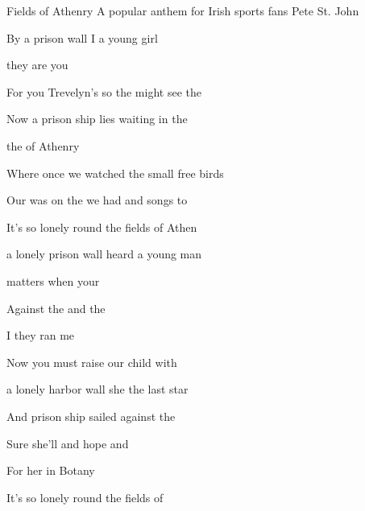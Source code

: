 \begin{SBSong}{Fields of Athenry}
  {A popular anthem for Irish sports fans}
  {Pete St. John}
  \begin{SBVerse}
    By a  prison wall I  a young girl  
    
     they are  you 

    For you  Trevelyn's  so the  might see the 

    Now a prison ship lies waiting in the 
  \end{SBVerse}
  \begin{SBChorus}
      the  of Athenry

    Where once we watched the small free birds 

    Our  was on the  we had  and songs to 

    It's so lonely round the fields of Athen
  \end{SBChorus}
  \begin{SBVerse}
     a lonely prison wall  heard a young man 

     matters  when your 

    Against the  and the 

    I  they ran me 

    Now you must raise our child with 
  \end{SBVerse}
  \begin{SBVerse}
     a lonely harbor wall she  the last star 
    
    And  prison ship sailed  against the 

    Sure she'll  and hope and 

    For her  in Botany 

    It's so lonely round the fields of 
  \end{SBVerse}
\end{SBSong}

